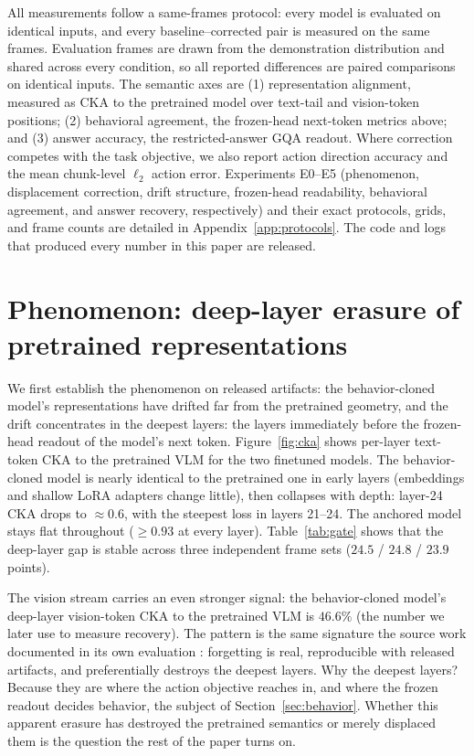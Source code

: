 \documentclass{article}
\begin{document}
All measurements follow a same-frames protocol: every model is evaluated on identical inputs,
and every baseline--corrected pair is measured on the same frames. Evaluation frames are drawn from the demonstration distribution and shared across every condition, so all reported differences are paired comparisons on identical inputs. The semantic axes are
(1) representation alignment, measured as CKA \cite{kornblith2019cka} to the pretrained model
over text-tail and vision-token positions; (2) behavioral agreement, the frozen-head next-token
metrics above; and (3) answer accuracy, the restricted-answer GQA readout. Where correction
competes with the task objective, we also report action direction accuracy and the mean
chunk-level $\ell_2$ action error. Experiments E0--E5 (phenomenon, displacement correction,
drift structure, frozen-head readability, behavioral agreement, and answer recovery,
respectively) and their exact protocols, grids, and frame counts are detailed in
Appendix~\ref{app:protocols}. The code and logs that produced
every number in this paper are released.

\section{Phenomenon: deep-layer erasure of pretrained representations}
\label{sec:phenomenon}

We first establish the phenomenon on released artifacts: the behavior-cloned model's
representations have drifted far from the pretrained geometry, and the drift concentrates in
the deepest layers: the layers immediately before the frozen-head readout of the
model's next token. Figure~\ref{fig:cka} shows per-layer text-token CKA to the pretrained VLM
for the two finetuned models. The behavior-cloned model is nearly identical to the pretrained
one in early layers (embeddings and shallow LoRA adapters change little), then collapses
with depth: layer-24 CKA drops to $\approx 0.6$, with the steepest loss in
layers 21--24. The anchored model stays flat throughout ($\ge 0.93$ at every layer). Table~\ref{tab:gate}
shows that the deep-layer gap is stable across three independent frame sets
($24.5$ / $24.8$ / $23.9$ points).

The vision stream carries an even stronger signal: the behavior-cloned model's deep-layer
vision-token CKA to the pretrained VLM is $46.6\%$ (the number we later use to measure
recovery). The pattern is the same signature the source work documented in its own evaluation
\cite{dalal2026anchoralign}: forgetting is real, reproducible with released artifacts, and
preferentially destroys the deepest layers. Why the deepest layers? Because they are where
the action objective reaches in, and where the frozen readout decides behavior, the subject
of Section~\ref{sec:behavior}. Whether this apparent erasure has destroyed the pretrained
semantics or merely displaced them is the question the rest of the paper turns on.
\end{document}
